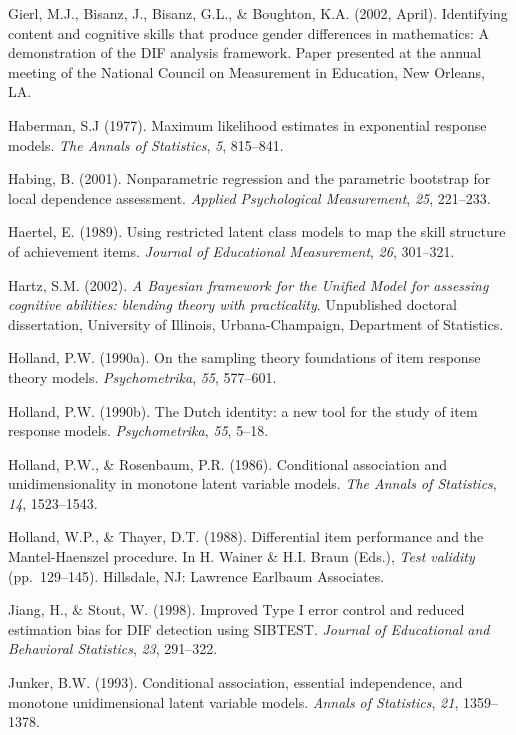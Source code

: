 \documentclass[titlepage,11pt,twoside]{article}
\begin{document}
\begin{thebibliography}
\bibitem Gierl, M.J., Bisanz, J., Bisanz, G.L., \& Boughton, K.A. (2002, April). Identifying content and cognitive skills that produce gender differences in mathematics: A demonstration of the DIF analysis framework. Paper presented at the annual meeting of the National Council on Measurement in Education, New Orleans, LA.

\bibitem Haberman, S.J (1977). Maximum likelihood estimates in exponential response models. \textit{The Annals of Statistics}, \textit{5}, 815--841.

\bibitem Habing, B. (2001). Nonparametric regression and the parametric bootstrap for local dependence assessment. \textit{Applied Psychological Measurement}, \textit{25}, 221--233.

\bibitem Haertel, E. (1989). Using restricted latent class models to map the skill structure of achievement items. \textit{Journal of Educational Measurement}, \textit{26}, 301--321.

\bibitem Hartz, S.M. (2002). \textit{A Bayesian framework for the Unified Model for assessing cognitive abilities: blending theory with practicality}. Unpublished doctoral dissertation, University of Illinois, Urbana-Champaign, Department of Statistics.

\bibitem Holland, P.W. (1990a). On the sampling theory foundations of item response theory models. \textit{Psychometrika}, \textit{55}, 577--601.

\bibitem Holland, P.W. (1990b). The Dutch identity: a new tool for the study of item response models. \textit{Psychometrika}, \textit{55}, 5--18.

\bibitem Holland, P.W., \& Rosenbaum, P.R. (1986). Conditional association and unidimensionality in monotone latent variable models. \textit{The Annals of Statistics}, \textit{14}, 1523--1543.

\bibitem Holland, W.P., \& Thayer, D.T. (1988). Differential item performance and the Mantel-Haenszel procedure. In H. Wainer \& H.I. Braun (Eds.), \textit{Test validity} (pp.~129--145). Hillsdale, NJ: Lawrence Earlbaum Associates.

\bibitem Jiang, H., \& Stout, W. (1998). Improved Type I error control and reduced estimation bias for DIF detection using SIBTEST. \textit{Journal of Educational and Behavioral Statistics}, \textit{23}, 291--322.

\bibitem Junker, B.W. (1993). Conditional association, essential independence, and monotone unidimensional latent variable models. \textit{Annals of Statistics}, \textit{21}, 1359--1378.


\end{thebibliography}
\end{document}
